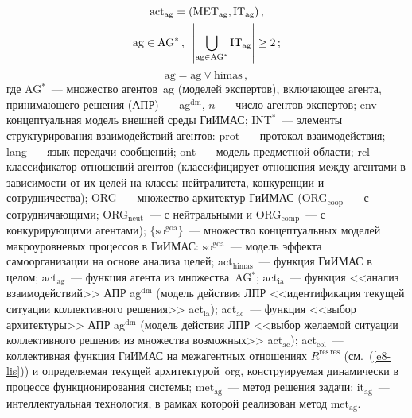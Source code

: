 \begin{multicols}{2}
\noindent
\begin{multline}
  \mathrm{act}_{\mathrm{ag}}= (\mathrm{MET}_{\mathrm{ag}},\mathrm{IT}_{\mathrm{ag}})\,,\\
   \mathrm{ag}\in \mathrm{AG}^*\,,\enskip 
   \left\vert \bigcup\limits_{\mathrm{ag}\in  \mathrm{AG}^*} \mathrm{IT}_{\mathrm{ag}}\right\vert \geq 2\,;
   \label{e6-lis}
\end{multline}
\begin{equation}  
\mathrm{ag}=\mathrm{ag}\vee \mathrm{himas}\,,\label{e7-lis}
  \end{equation}
где AG$^*$~--- множество агентов~ag (моделей экспертов), включающее 
агента, принимающего решения (АПР)~--- ag$^{\mathrm{dm}}$, $n$~--- чис\-ло 
аген\-тов-экс\-пер\-тов; env~--- концептуальная модель внешней среды 
ГиИМАС; INT$^*$~--- элементы структурирования взаимодействий агентов: 
prot~--- протокол взаимодействия; lang~--- язык передачи сообщений; 
ont~--- модель предметной области; rcl~--- классификатор отношений 
агентов (классифицирует отношения между агентами в зависимости от их 
целей на классы нейтралитета, конкуренции и сотрудничества); ORG~--- 
множество архитектур ГиИМАС (ORG$_{\mathrm{coop}}$~--- с сотрудничающими; 
ORG$_{\mathrm{neut}}$~--- с нейтральными и ORG$_{\mathrm{comp}}$~--- с конкурирующими 
агентами); $\{\mathrm{so}^{\mathrm{goa}}\}$~--- множество концептуальных моделей 
макроуровневых процессов в ГиИМАС: $\mathrm{so}^{\mathrm{goa}}$~--- модель эффекта 
самоорганизации на основе анализа целей; act$_{\mathrm{himas}}$~--- функция ГиИМАС 
в целом; act$_{\mathrm{ag}}$~--- функция агента из множества~AG$^*$; act$_{\mathrm{ia}}$~--- 
функция <<анализ взаимодействий>> АПР ag$^{\mathrm{dm}}$ (модель действия ЛПР 
<<идентификация текущей ситуации коллективного решения>> act$_{\mathrm{ia}}$); 
act$_{\mathrm{ac}}$~--- функция <<выбор архитектуры>> АПР ag$^{\mathrm{dm}}$ (модель 
действия ЛПР <<выбор желаемой ситуации коллективного решения из 
множества возможных>> act$_{\mathrm{ac}}$); act$_{\mathrm{col}}$~--- коллективная функция 
ГиИМАС на межагентных отношениях $R^{\mathrm{res\,res}}$ (см.~(\ref{e8-lis})) 
и определяемая текущей архитектурой~org, 
конструируемая динамически в процессе функционирования системы; 
$\mathrm{met}_{\mathrm{ag}}$~--- метод решения задачи; it$_{\mathrm{ag}}$~--- интеллектуальная 
технология, в рамках которой реализован метод met$_{\mathrm{ag}}$.
  

\end{multicols}
